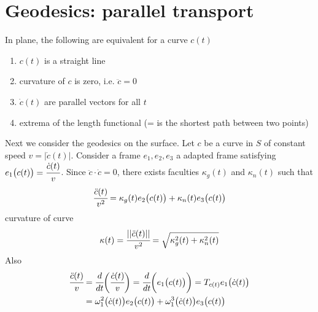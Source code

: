 \documentclass[10pt]{article}
\begin{document}
        \newpage
        \section{Geodesics: parallel transport}
            \begin{proposition}
                In plane, the following are equivalent for a curve $c(t)$
                \begin{enumerate}
                    \item $c(t)$ is a straight line
                    \item curvature of $c$ is zero, i.e. $\ddot{c} = 0$
                    \item $\dot{c}(t)$ are parallel vectors for all $t$
                    \item extrema of the length functional (= is the shortest path between two points)
                \end{enumerate}
            \end{proposition}
            Next we consider the geodesics on the surface. Let $c$ be a curve in $S$ of constant speed $v=|\dot{c}(t)|$. Consider a frame $e_1, e_2, e_3$ a adapted frame satisfying $e_1\big(c(t)\big) = \cfrac{\dot{c}(t)}{v}$. Since $\ddot{c}\cdot\dot{c} = 0$, there exists faculties $\kappa_g(t)$ and $\kappa_n(t)$ such that
            \begin{equation*}
                \begin{aligned}
                    \cfrac{\ddot{c}(t)}{v^2} = \kappa_g(t)e_2\big(c(t)\big) + \kappa_n(t)e_3\big(c(t)\big)
                \end{aligned}
            \end{equation*}
            curvature of curve
            \begin{equation*}
                \begin{aligned}
                    \kappa(t) = \cfrac{||\ddot{c}(t)||}{v^2} = \sqrt{\kappa_g^2(t) + \kappa_n^2(t)}
                \end{aligned}
            \end{equation*}
            Also
            \begin{equation*}
                \begin{aligned}
                    \cfrac{\ddot{c}(t)}{v} &= \cfrac{d}{dt}\bigg( \cfrac{\dot{c}(t)}{v}\bigg) = \cfrac{d}{dt}\bigg( e_1\big(c(t)\big)\bigg) = T_{c(t)}e_1\big( \dot{c}(t) \big) \\
                    &= \omega_1^2\big(\dot{c}(t)\big)e_2\big(c(t)\big) + \omega_1^3\big(\dot{c}(t)\big)e_3\big(c(t)\big)
                \end{aligned}
            \end{equation*}
\end{document}
